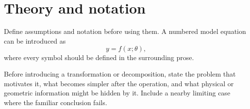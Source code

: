 \section{Theory and notation}
\label{sec:theory}

Define assumptions and notation before using them. A numbered model equation
can be introduced as
\begin{equation}
  y = f(x;\theta),
  \label{eq:model}
\end{equation}
where every symbol should be defined in the surrounding prose.

Before introducing a transformation or decomposition, state the problem that
motivates it, what becomes simpler after the operation, and what physical or
geometric information might be hidden by it. Include a nearby limiting case
where the familiar conclusion fails.
